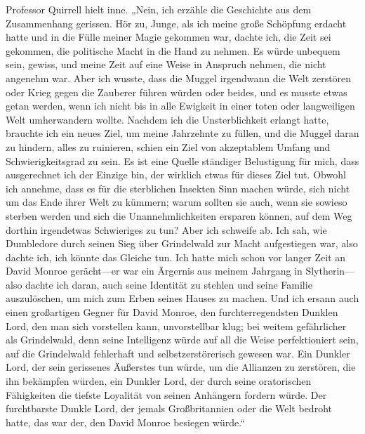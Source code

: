Professor Quirrell hielt inne.
„Nein, ich erzähle die Geschichte aus dem Zusammenhang gerissen. Hör zu, Junge, als ich meine große Schöpfung erdacht hatte und in die Fülle meiner Magie gekommen war, dachte ich, die Zeit sei gekommen, die politische Macht in die Hand zu nehmen. Es würde unbequem sein, gewiss, und meine Zeit auf eine Weise in Anspruch nehmen, die nicht angenehm war. Aber ich wusste, dass die Muggel irgendwann die Welt zerstören oder Krieg gegen die Zauberer führen würden oder beides, und es musste etwas getan werden, wenn ich nicht bis in alle Ewigkeit in einer toten oder langweiligen Welt umherwandern wollte. Nachdem ich die Unsterblichkeit erlangt hatte, brauchte ich ein neues Ziel, um meine Jahrzehnte zu füllen, und die Muggel daran zu hindern, alles zu ruinieren, schien ein Ziel von akzeptablem Umfang und Schwierigkeitsgrad zu sein. Es ist eine Quelle ständiger Belustigung für mich, dass ausgerechnet ich der Einzige bin, der wirklich etwas für dieses Ziel tut. Obwohl ich annehme, dass es für die sterblichen Insekten Sinn machen würde, sich nicht um das Ende ihrer Welt zu kümmern; warum sollten sie auch, wenn sie sowieso sterben werden und sich die Unannehmlichkeiten ersparen können, auf dem Weg dorthin irgendetwas Schwieriges zu tun? Aber ich schweife ab. Ich sah, wie Dumbledore durch seinen Sieg über Grindelwald zur Macht aufgestiegen war, also dachte ich, ich könnte das Gleiche tun. Ich hatte mich schon vor langer Zeit an David Monroe gerächt—er war ein Ärgernis aus meinem Jahrgang in Slytherin—also dachte ich daran, auch seine Identität zu stehlen und seine Familie auszulöschen, um mich zum Erben seines Hauses zu machen. Und ich ersann auch einen großartigen Gegner für David Monroe, den furchterregendsten Dunklen Lord, den man sich vorstellen kann, unvorstellbar klug; bei weitem gefährlicher als Grindelwald, denn seine Intelligenz würde auf all die Weise perfektioniert sein, auf die Grindelwald fehlerhaft und selbstzerstörerisch gewesen war. Ein Dunkler Lord, der sein gerissenes Äußerstes tun würde, um die Allianzen zu zerstören, die ihn bekämpfen würden, ein Dunkler Lord, der durch seine oratorischen Fähigkeiten die tiefste Loyalität von seinen Anhängern fordern würde. Der furchtbarste Dunkle Lord, der jemals Großbritannien oder die Welt bedroht hatte, das war der, den David Monroe besiegen würde.“

